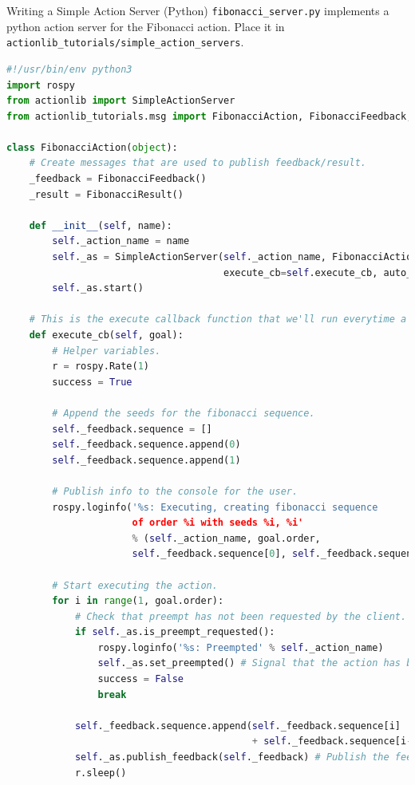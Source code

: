 \begin{frame}{Writing a Simple Action Server (Python)}
\texttt{fibonacci\_server.py} implements a python action server for the Fibonacci action. Place it in \texttt{actionlib\_tutorials/simple\_action\_servers}.

\begin{lstlisting}[language=python]  
#!/usr/bin/env python3
import rospy
from actionlib import SimpleActionServer
from actionlib_tutorials.msg import FibonacciAction, FibonacciFeedback, FibonacciResult

class FibonacciAction(object):
    # Create messages that are used to publish feedback/result.
    _feedback = FibonacciFeedback()
    _result = FibonacciResult()

    def __init__(self, name):
        self._action_name = name
        self._as = SimpleActionServer(self._action_name, FibonacciAction,
                                      execute_cb=self.execute_cb, auto_start = False)
        self._as.start()
        
    # This is the execute callback function that we'll run everytime a new goal is received.
    def execute_cb(self, goal):
        # Helper variables.
        r = rospy.Rate(1)
        success = True
        
        # Append the seeds for the fibonacci sequence.
        self._feedback.sequence = []
        self._feedback.sequence.append(0)
        self._feedback.sequence.append(1)
        
        # Publish info to the console for the user.
        rospy.loginfo('%s: Executing, creating fibonacci sequence 
                      of order %i with seeds %i, %i'
                      % (self._action_name, goal.order, 
                      self._feedback.sequence[0], self._feedback.sequence[1]))

        # Start executing the action.
        for i in range(1, goal.order):
            # Check that preempt has not been requested by the client.
            if self._as.is_preempt_requested():
                rospy.loginfo('%s: Preempted' % self._action_name)
                self._as.set_preempted() # Signal that the action has been preempted.
                success = False
                break

            self._feedback.sequence.append(self._feedback.sequence[i]
                                           + self._feedback.sequence[i-1])
            self._as.publish_feedback(self._feedback) # Publish the feedback.
            r.sleep()
            

\end{lstlisting}
\end{frame}
